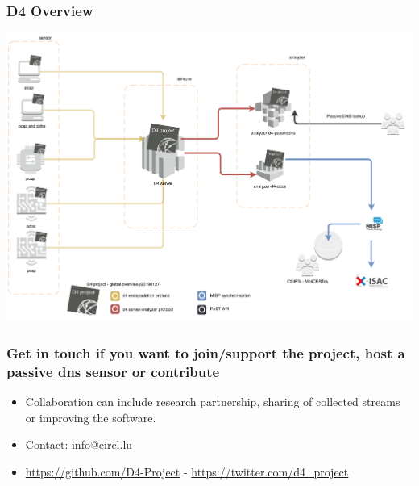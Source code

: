 \documentclass{beamer}
\begin{document}
\begin{frame}
\frametitle{D4 Overview}
        \includegraphics[scale=0.38]{d4-overview.pdf}
\end{frame}

\begin{frame}
\frametitle{Get in touch if you want to join/support the project, host a passive dns sensor or contribute}
\begin{itemize}
\item Collaboration can include research partnership, sharing of collected streams or improving the software.
\item Contact: info@circl.lu
\item \url{https://github.com/D4-Project} -  \url{https://twitter.com/d4_project}
\end{itemize}
\end{frame}
\end{document}
